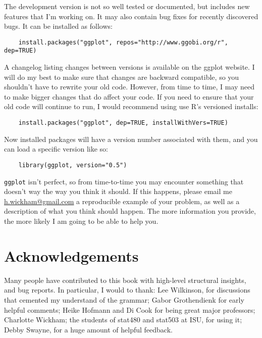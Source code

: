 The development version is not so well tested or documented, but includes new features that I'm working on.  It may also contain bug fixes for recently discovered bugs.  It can be installed as follows:

\begin{verbatim}
	install.packages("ggplot", repos="http://www.ggobi.org/r", dep=TRUE)
\end{verbatim}

A changelog listing changes between versions is available on the ggplot website.  I will do my best to make sure that changes are backward compatible, so you shouldn't have to rewrite your old code.  However, from time to time, I may need to make bigger changes that do affect your code.  If you need to ensure that your old code will continue to run, I would recommend using use R's versioned installs:

\begin{verbatim}
	install.packages("ggplot", dep=TRUE, installWithVers=TRUE)
\end{verbatim}

Now installed packages will have a version number associated with them, and you can load a specific version like so:

\begin{verbatim}
	library(ggplot, version="0.5")
\end{verbatim}

{\tt ggplot} isn't perfect, so from time-to-time you may encounter something that doesn't way the way you think it should.  If this happens, please email me \href{mailto:h.wickham@gmail.com}{h.wickham@gmail.com} a reproducible example of your problem, as well as a description of what you think should happen.  The more information you provide, the more likely I am going to be able to help you.

\section{Acknowledgements}\label{sec:acknolwedgements}

Many people have contributed to this book with high-level structural insights, and bug reports.  In particular, I would to thank: Lee Wilkinson, for discussions that cemented my understand of the grammar; Gabor Grothendienk for early helpful comments; Heike Hofmann and Di Cook for being great major professors; Charlotte Wickham; the students of stat480 and stat503 at ISU, for using it; Debby Swayne, for a huge amount of helpful feedback.


